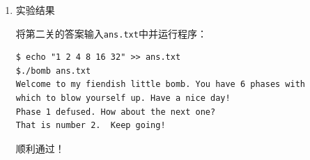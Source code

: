 \documentclass{paper}
\begin{document}
\begin{enumerate}
\begin{enumerate}
\begin{lstlisting}[language=C]
Breakpoint 1, 0x08048b76 in phase_2 ()
(gdb) x /6uw 0x4+$esp // 通过观察0x4+$esp中的内容
0xffffc954:     1       1       4       5
0xffffc964:     1       4
\end{lstlisting}

通过观察\verb|0x4+$esp|中的内容可以发现，我们输入的数字存放在以\verb|0x4+$esp|为首地址的连续内存中。

\item 找出所需要输入的数字具体的值 

接着分析代码段，找出第一个数字的值：

\begin{lstlisting}
8048b76:	83 7c 24 04 01       	cmpl   $0x1,0x4(%esp) // 第一个数字
8048b7b:	74 05                	je     8048b82 <phase_2+0x2e>
8048b7d:	e8 9f 05 00 00       	call   8049121 <explode_bomb>
8048b82:	8d 5c 24 04          	lea    0x4(%esp),%ebx
\end{lstlisting}

上述代码段的逻辑十分简单，即：若第一个数字等于\verb|0x1|则跳过\verb|explode_bomb|函数。因此，我们需要输入的第一个数字是\verb|1|。

分析接下来的循环结构代码，得出剩下数字的值：

\begin{lstlisting}
8048b82:	8d 5c 24 04        lea    0x4(%esp),%ebx // 首地址
8048b86:	8d 74 24 18        lea    0x18(%esp),%esi // 尾地址
8048b8a:	8b 03              mov    (%ebx),%eax // loop start
8048b8c:	01 c0              add    %eax,%eax
8048b8e:	39 43 04           cmp    %eax,0x4(%ebx)
8048b91:	74 05              je     8048b98 <phase_2+0x44>
8048b93:	e8 89 05 00 00     call   8049121 <explode_bomb>
8048b98:	83 c3 04           add    $0x4,%ebx
8048b9b:	39 f3              cmp    %esi,%ebx
8048b9d:	75 eb              jne    8048b8a <phase_2+0x36> // loop end
\end{lstlisting}

由\verb|0x18 = 24 = 6*sizeof(int)|可知，\verb|0x18+%esp|是第六个数字的地址。分析上述代码：进入循环前程序先将数组的首地址存放在\verb|%ebx|中，将数组的尾地址存放在\verb|%esi|中。进入循环后，程序将当前数字存放在\verb|%eax|中，并将\verb|2*%eax|与下一个数字（\verb|0x4(%ebx)|）进行比较，若两者相等，则跳过\verb|explode_bomb|。因此剩下的数字的值分别是前一个数字的两倍。

综合上述分析可知，由于第一个数字是\verb|1|，因此接下来的每一个数字分别是\verb|2、4、8、16、32|。

\end{enumerate}

\item 实验结果

将第二关的答案输入\verb|ans.txt|中并运行程序：

\begin{lstlisting}
$ echo "1 2 4 8 16 32" >> ans.txt
$./bomb ans.txt
Welcome to my fiendish little bomb. You have 6 phases with
which to blow yourself up. Have a nice day!
Phase 1 defused. How about the next one?
That is number 2.  Keep going!
\end{lstlisting}

顺利通过！

\end{enumerate}
\end{document}
